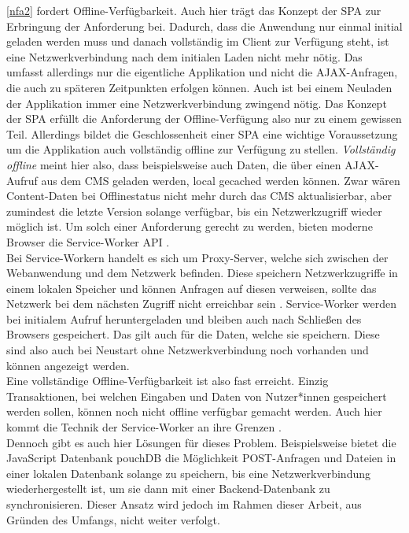 \ref{nfa2} fordert Offline-Verfügbarkeit. Auch hier trägt das Konzept der SPA zur 
Erbringung der Anforderung bei. Dadurch, dass die Anwendung nur einmal initial geladen werden muss 
und danach vollständig im Client zur Verfügung steht, ist eine Netzwerkverbindung nach dem initialen 
Laden nicht mehr nötig. Das umfasst allerdings nur die eigentliche Applikation und nicht die
AJAX-Anfragen, die auch zu späteren Zeitpunkten erfolgen können. Auch ist bei einem Neuladen
der Applikation immer eine Netzwerkverbindung zwingend nötig. Das Konzept der SPA erfüllt
die Anforderung der Offline-Verfügung also nur zu einem gewissen Teil. Allerdings bildet die Geschlossenheit
einer SPA eine wichtige Voraussetzung um die Applikation auch vollständig offline zur Verfügung
zu stellen. \emph{Vollständig offline} meint hier also, dass beispielsweise auch Daten, die über
einen AJAX-Aufruf aus dem CMS geladen werden, local gecached werden können. Zwar wären Content-Daten bei
Offlinestatus nicht mehr durch das CMS aktualisierbar, aber zumindest die letzte Version solange verfügbar,
bis ein Netzwerkzugriff wieder möglich ist. Um solch einer Anforderung gerecht zu werden, bieten moderne 
Browser die Service-Worker API \cite{service-worker-api}.\\ 
Bei Service-Workern handelt es sich um Proxy-Server, welche sich zwischen der Webanwendung und dem 
Netzwerk befinden. Diese speichern Netzwerkzugriffe in einem lokalen Speicher und können Anfragen auf
diesen verweisen, sollte das Netzwerk bei dem nächsten Zugriff nicht erreichbar sein \cite{service-worker-api}.
Service-Worker werden bei initialem Aufruf heruntergeladen und bleiben auch nach Schließen des Browsers
gespeichert. Das gilt auch für die Daten, welche sie speichern. Diese sind also auch bei Neustart ohne
Netzwerkverbindung noch vorhanden und können angezeigt werden.\\
Eine vollständige Offline-Verfügbarkeit ist also fast erreicht. Einzig Transaktionen, bei welchen Eingaben
und Daten von Nutzer*innen gespeichert werden sollen, können noch nicht offline verfügbar gemacht werden.
Auch hier kommt die Technik der Service-Worker an ihre Grenzen \cite{service-worker-post}.\\
Dennoch gibt es auch hier Lösungen für dieses
Problem. Beispielsweise bietet die JavaScript Datenbank pouchDB \cite{pouchdb} die Möglichkeit POST-Anfragen
und Dateien in einer lokalen Datenbank solange zu speichern, bis eine Netzwerkverbindung wiederhergestellt ist,
um sie dann mit einer Backend-Datenbank zu synchronisieren. Dieser Ansatz wird jedoch im Rahmen dieser Arbeit,
aus Gründen des Umfangs, nicht weiter verfolgt.\\

